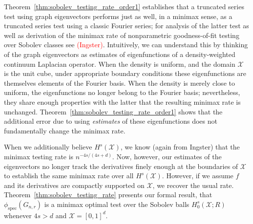 \documentclass{article}
\newcommand{\1}{\mathbf{1}}
\newcommand{\Xset}{\mathcal{X}}
\theoremstyle{alden}
\theoremstyle{aldenthm}
\theoremstyle{definition}
\theoremstyle{remark}
\begin{document}
Theorem~\ref{thm:sobolev_testing_rate_order1} establishes that a truncated series test using graph eigenvectors performs just as well, in a minimax sense, as a truncated series test using a classic Fourier series; for analysis of the latter test as well as derivation of the minimax rate of nonparametric goodness-of-fit testing over Sobolev classes see \textcolor{red}{(Ingster)}. Intuitively, we can understand this by thinking of the graph eigenvectors as estimates of eigenfunctions of a density-weighted continuum Laplacian operator. When the density is uniform, and the domain $\Xset$ is the unit cube, under appropriate boundary conditions these eigenfunctions are themselves elements of the Fourier basis. When the density is merely close to uniform, the eigenfunctions no longer belong to the Fourier basis; nevertheless, they share enough properties with the latter that the resulting minimax rate is unchanged. Theorem~\ref{thm:sobolev_testing_rate_order1} shows that the additional error due to using \textit{estimates} of these eigenfunctions does not fundamentally change the minimax rate. 

When we additionally believe $H^s(\Xset)$, we know (again from Ingster) that the minimax testing rate is $n^{-4s/(4s + d)}$. Now, however, our estimates of the eigenvectors no longer track the derivatives finely enough at the boundaries of $\Xset$ to establish the same minimax rate over all $H^s(\mathcal{X})$. However, if we assume $f$ and its derivatives are compactly supported on $\Xset$, we recover the usual rate. Theorem~\ref{thm:sobolev_testing_rate} presents our formal result, that $\phi_{\textrm{spec}}(G_{n,r})$ is a minimax optimal test over the Sobolev balls $H_0^s(\mathcal{X};R)$ whenever $4s > d$ and $\Xset = [0,1]^d$.
\end{document}
